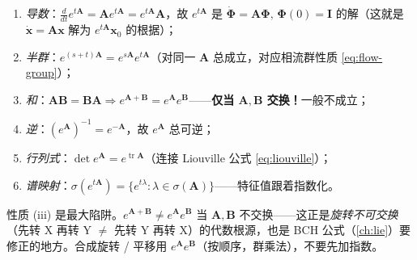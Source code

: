 \begin{proposition}[矩阵指数的基本性质]\label{prop:exp-props}
\begin{enumerate}
  \item \emph{导数}：$\frac{d}{dt}e^{t\mathbf{A}}=\mathbf{A}e^{t\mathbf{A}}=e^{t\mathbf{A}}\mathbf{A}$，故 $e^{t\mathbf{A}}$ 是 $\dot{\boldsymbol{\Phi}}=\mathbf{A}\boldsymbol{\Phi},\,\boldsymbol{\Phi}(0)=\mathbf{I}$ 的解（这就是 $\dot{\mathbf{x}}=\mathbf{A}\mathbf{x}$ 解为 $e^{t\mathbf{A}}\mathbf{x}_0$ 的根据）；
  \item \emph{半群}：$e^{(s+t)\mathbf{A}}=e^{s\mathbf{A}}e^{t\mathbf{A}}$（对同一 $\mathbf{A}$ 总成立，对应相流群性质 \cref{eq:flow-group}）；
  \item \emph{和}：$\mathbf{A}\mathbf{B}=\mathbf{B}\mathbf{A}\Rightarrow e^{\mathbf{A}+\mathbf{B}}=e^{\mathbf{A}}e^{\mathbf{B}}$——\textbf{仅当 $\mathbf{A},\mathbf{B}$ 交换！}一般不成立；
  \item \emph{逆}：$(e^{\mathbf{A}})^{-1}=e^{-\mathbf{A}}$，故 $e^{\mathbf{A}}$ 总可逆；
  \item \emph{行列式}：$\det e^{\mathbf{A}}=e^{\operatorname{tr}\mathbf{A}}$（连接 Liouville 公式 \cref{eq:liouville}）；
  \item \emph{谱映射}：$\sigma(e^{t\mathbf{A}})=\{e^{t\lambda}:\lambda\in\sigma(\mathbf{A})\}$——特征值跟着指数化。
\end{enumerate}
\end{proposition}

\begin{pitfall}[概念误区：误以为 $e^{\mathbf{A}+\mathbf{B}}=e^{\mathbf{A}}e^{\mathbf{B}}$ 总成立]
性质 (iii) 是最大陷阱。$e^{\mathbf{A}+\mathbf{B}}\neq e^{\mathbf{A}}e^{\mathbf{B}}$ 当 $\mathbf{A},\mathbf{B}$ 不交换——这正是\emph{旋转不可交换}（先转 X 再转 Y $\neq$ 先转 Y 再转 X）的代数根源，也是 BCH 公式（\cref{ch:lie}）要修正的地方。合成旋转 / 平移用 $e^{\mathbf{A}}e^{\mathbf{B}}$（按顺序，群乘法），不要先加指数。
\end{pitfall}

